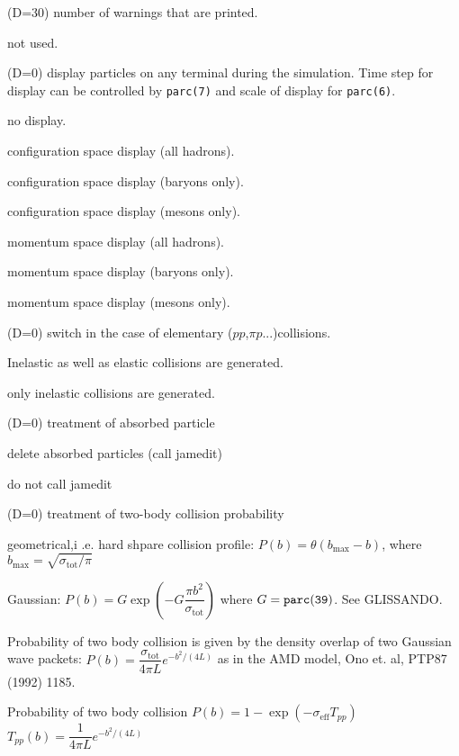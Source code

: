 \documentclass[]{article}
\newenvironment{entry}%
{\begin{list}{}{\setlength{\topsep}{0mm} \setlength{\itemsep}{0mm}
\setlength{\parskip}{0mm} \setlength{\parsep}{0mm}
\setlength{\leftmargin}{20mm} \setlength{\rightmargin}{0mm}
\setlength{\labelwidth}{18mm} \setlength{\labelsep}{2mm}}}%
{\end{list}}
\newenvironment{subentry}%
{\begin{list}{}{\setlength{\topsep}{0mm} \setlength{\itemsep}{0mm}
\setlength{\parskip}{0mm} \setlength{\parsep}{0mm}
\setlength{\leftmargin}{10mm} \setlength{\rightmargin}{0mm}
\setlength{\labelwidth}{18mm} \setlength{\labelsep}{2mm}}}%
{\end{list}}
\newcommand{\ttt}[1]{{\tt#1}}
\newcommand{\itemt}[1]{\item[{\tt #1}\hfill]}
\begin{document}
\begin{entry}
\itemt{mstc(14)  :} (D=30) number of warnings that are printed.

\itemt{mstc(15)  :} not used.

\itemt{mstc(16)  :}(D=0) display particles on any terminal during the 
                   simulation.  Time step for display can be controlled
                   by \ttt{parc(7)} and scale of display for \ttt{parc(6)}.
\begin{subentry}
       \itemt{$=0$ :} no display.
       \itemt{$=1$ :} configuration space display (all hadrons).
       \itemt{$=2$ :} configuration space display (baryons only).
       \itemt{$=3$ :} configuration space display (mesons only).
       \itemt{$=11$:} momentum space display (all hadrons).
       \itemt{$=12$:} momentum space display (baryons only).
       \itemt{$=13$:} momentum space display (mesons only).
\end{subentry}

\itemt{mstc(17):} (D=0) switch in the case of elementary
           ($pp$,$\pi p$...)collisions.
\begin{subentry}
       \itemt{$=0$ :} Inelastic as well as  elastic collisions are
                      generated.
       \itemt{$=1$ :} only inelastic collisions are generated.
\end{subentry}

\itemt{mstc(18):}(D=0)  treatment of absorbed particle
\begin{subentry}
       \itemt{$=0$ :} delete absorbed particles (call jamedit)
       \itemt{$=1$ :} do not call jamedit
\end{subentry}
\itemt{mstc(19)  :}(D=0) treatment of two-body collision probability 
\begin{subentry}
       \itemt{$=0$ :} geometrical,i .e. hard shpare collision profile:
        $P(b)=\theta(b_\text{max}-b)$, 
       where $b_\text{max}=\sqrt{\sigma_\text{tot}/\pi}$
       \itemt{$=1$ :} Gaussian:
       $P(b)=G\exp\left(-G\dfrac{\pi b^2}{\sigma_\text{tot}}\right)$
       where $G=\ttt{parc(39)}$. See GLISSANDO.
       \itemt{$=2$ :} Probability of two body collision 
        is given by the density overlap of two Gaussian wave packets:
	$P(b)=\dfrac{\sigma_\text{tot}}{4\pi L}e^{-b^2/(4L)}$
	as in the AMD model, Ono et. al, PTP87 (1992) 1185.
       \itemt{$=3$ :} Probability of two body collision 
	$P(b)=1 - \exp(-\sigma_\text{eff}T_{pp}) $
	$T_{pp}(b)=\dfrac{1}{4\pi L}e^{-b^2/(4L)}$
      
\end{subentry}



\end{entry}
\end{document}
